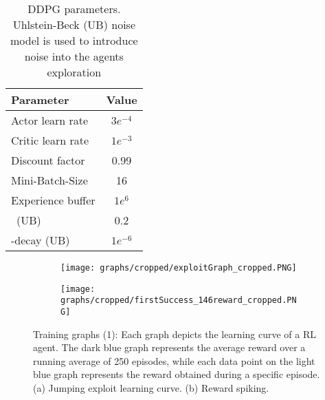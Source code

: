 {\def\arraystretch{1.4}\tabcolsep=5pt
\begin{table}
	\centering
	\begin{tabular}{| l | c |}
		\hline
		\textbf{Parameter} & \textbf{Value}\\
		\hline
		\hline
		Actor learn rate & $3e^{-4}$ \\
		Critic learn rate & $1e^{-3}$ \\
		Discount factor &  0.99 \\
		Mini-Batch-Size & 16 \\
		Experience buffer & $1e^6$\\
		\textsigma \ (UB) & 0.2 \\
		\textsigma-decay (UB) & $1e^{-6}$ \\
		
		\hline
	\end{tabular}
	\caption[DDPG parameters]{DDPG parameters. Uhlstein-Beck (UB) noise model is used to introduce noise into the agents exploration}
	\label{table: DDPG parameters}
\end{table}
}


\begin{figure}[h]
	\begin{subfigure}{\textwidth} %
		\centering
		\texttt{[image: graphs/cropped/exploitGraph\_cropped.PNG]}  %
		\caption{}
		\label{figure: RL a}
	\end{subfigure}
	\begin{subfigure}{\textwidth}
		\centering
		\texttt{[image: graphs/cropped/firstSuccess\_146reward\_cropped.PNG]}  
		\caption{}
		\label{figure: RL b}
	\end{subfigure} 
		\caption[Training graphs (1)]{Training graphs (1): Each graph depicts the learning curve of a RL agent. The dark blue graph represents the average reward over a running average of 250 episodes, while each data point on the light blue graph represents the reward obtained during a specific episode. (a) Jumping exploit learning curve. (b) Reward spiking.
		}
	\label{figure: DDPG learning graphs 1}
\end{figure}

